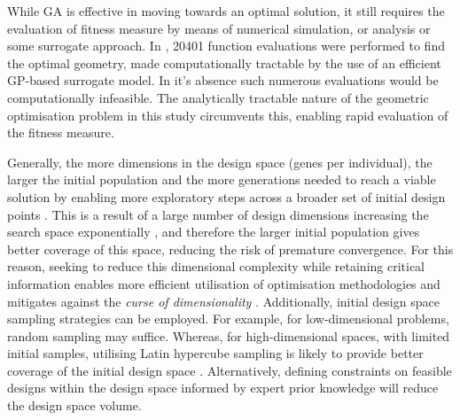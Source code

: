 \documentclass{article}
\begin{document}
While GA is effective in moving towards an optimal solution, it still requires the evaluation of fitness measure by means of numerical simulation, or analysis or some surrogate approach. In \cite{Taj2023}, 20401 function evaluations were performed to find the optimal geometry, made computationally  tractable by the use of an efficient GP-based surrogate model. In it's absence  such numerous evaluations would be computationally infeasible. The analytically tractable nature of the geometric optimisation problem in this study circumvents this, enabling rapid evaluation of the fitness measure. 

Generally, the more dimensions in the design space (genes per individual), the larger the initial population and the more generations needed to reach a viable solution by enabling more exploratory steps across a broader set of initial design points \citep{Gibbs2011}. This is a result of a large number of design dimensions increasing the search space exponentially \citep{Keogh2017}, and therefore the larger initial population gives better coverage of this space, reducing the risk of premature convergence. For this reason, seeking to reduce this dimensional complexity while retaining critical information enables more efficient utilisation of optimisation methodologies and mitigates against the \textit{curse of dimensionality} \citep{Serani2024}. Additionally, initial design space sampling strategies can be employed. For example, for low-dimensional problems, random sampling may suffice. Whereas, for high-dimensional spaces, with limited initial samples, utilising Latin hypercube sampling is likely to provide better coverage of the initial design space \citep{Kucherenko2015}. Alternatively, defining constraints on feasible designs within the design space informed by expert prior knowledge will reduce the design space volume. 
\end{document}

